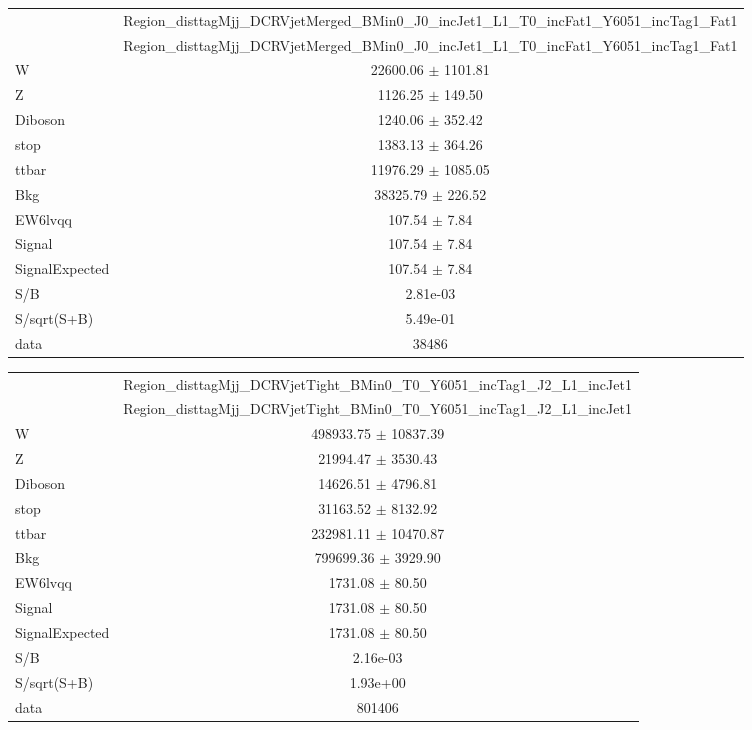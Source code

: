 \documentclass{article}
\begin{document}
\begin{table}
\centering
\small
\begin{tabular}{l|c|}
\cline{2-2}
 & \multicolumn{1}{c|}{Region\_disttagMjj\_DCRVjetMerged\_BMin0\_J0\_incJet1\_L1\_T0\_incFat1\_Y6051\_incTag1\_Fat1}\\
\cline{2-2}
 & \multicolumn{1}{c|}{Region\_disttagMjj\_DCRVjetMerged\_BMin0\_J0\_incJet1\_L1\_T0\_incFat1\_Y6051\_incTag1\_Fat1}\\ \hline
W & 22600.06 $\pm$ 1101.81\\
Z & 1126.25 $\pm$ 149.50\\
Diboson & 1240.06 $\pm$ 352.42\\
stop & 1383.13 $\pm$ 364.26\\
ttbar & 11976.29 $\pm$ 1085.05\\
\hline
Bkg & 38325.79 $\pm$ 226.52\\
\hline
EW6lvqq & 107.54 $\pm$ 7.84\\
\hline
Signal & 107.54 $\pm$ 7.84\\
SignalExpected & 107.54 $\pm$ 7.84\\
\hline
S/B & 2.81e-03\\
S/sqrt(S+B) & 5.49e-01\\
\hline
data & 38486\\ \hline
\end{tabular}
\end{table}


\begin{table}
\centering
\small
\begin{tabular}{l|c|}
\cline{2-2}
 & \multicolumn{1}{c|}{Region\_disttagMjj\_DCRVjetTight\_BMin0\_T0\_Y6051\_incTag1\_J2\_L1\_incJet1}\\
\cline{2-2}
 & \multicolumn{1}{c|}{Region\_disttagMjj\_DCRVjetTight\_BMin0\_T0\_Y6051\_incTag1\_J2\_L1\_incJet1}\\ \hline
W & 498933.75 $\pm$ 10837.39\\
Z & 21994.47 $\pm$ 3530.43\\
Diboson & 14626.51 $\pm$ 4796.81\\
stop & 31163.52 $\pm$ 8132.92\\
ttbar & 232981.11 $\pm$ 10470.87\\
\hline
Bkg & 799699.36 $\pm$ 3929.90\\
\hline
EW6lvqq & 1731.08 $\pm$ 80.50\\
\hline
Signal & 1731.08 $\pm$ 80.50\\
SignalExpected & 1731.08 $\pm$ 80.50\\
\hline
S/B & 2.16e-03\\
S/sqrt(S+B) & 1.93e+00\\
\hline
data & 801406\\ \hline
\end{tabular}
\end{table}
\end{document}
